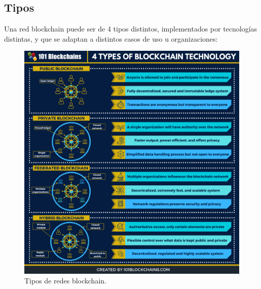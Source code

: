 \subsection{Tipos}
Una red blockchain puede ser de 4 tipos distintos, implementados por tecnologías distintas, y que se adaptan a distintos casos de uso u organizaciones:
\begin{figure}[h]
\centerline{\includegraphics[scale=.2]{recursos/Types-of-Blockchain-Technology-1982x2048.png}}
\caption{Tipos de redes blockchain.}
\label{tipos-BC}
\end{figure}

